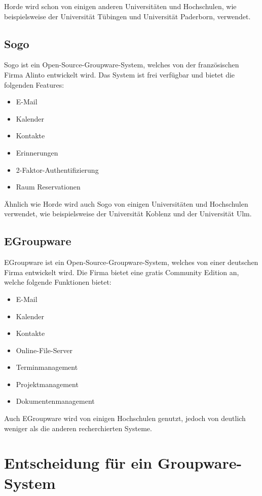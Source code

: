 Horde wird schon von einigen anderen Universitäten und Hochschulen, wie beispielsweise der Universität Tübingen und Universität Paderborn, verwendet.

\subsection{Sogo}

Sogo ist ein Open-Source-Groupware-System, welches von der französischen Firma Alinto entwickelt wird.
Das System ist frei verfügbar und bietet die folgenden Features:

\begin{itemize}
    \item E-Mail
    \item Kalender
    \item Kontakte
    \item Erinnerungen
    \item 2-Faktor-Authentifizierung
    \item Raum Reservationen
\end{itemize}
\autocite[Quelle:][]{sogo}

Ähnlich wie Horde wird auch Sogo von einigen Universitäten und Hochschulen verwendet, wie beispielsweise der Universität Koblenz und der Universität Ulm.

\subsection{EGroupware}

EGroupware ist ein Open-Source-Groupware-System, welches von einer deutschen Firma entwickelt wird.
Die Firma bietet eine gratis Community Edition an, welche folgende Funktionen bietet:

\begin{itemize}
    \item E-Mail
    \item Kalender
    \item Kontakte
    \item Online-File-Server
    \item Terminmanagement
    \item Projektmanagement
    \item Dokumentenmanagement
\end{itemize}

Auch EGroupware wird von einigen Hochschulen genutzt, jedoch von deutlich weniger als die anderen recherchierten Systeme.


\section{Entscheidung für ein Groupware-System}

